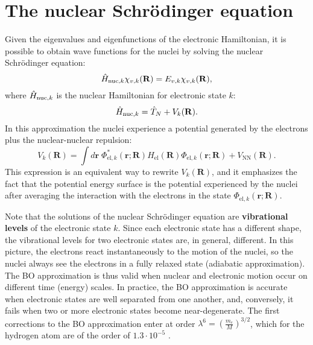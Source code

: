 \documentclass[../Main/chem532-notes.tex]{subfiles}
\begin{document}
\section{The nuclear Schr\"{o}dinger equation}
Given the eigenvalues and eigenfunctions of the electronic Hamiltonian, it is possible to obtain wave functions for the nuclei by solving the nuclear Schr\"{o}dinger equation:
\begin{equation}
\hat{H}_{{\rm nuc},k} \chi_{v,k}(\mathbf{R}) =  E_{v,k} \chi_{v,k}(\mathbf{R}),
\end{equation}
where $\hat{H}_{{\rm nuc},k}$ is the nuclear Hamiltonian for electronic state $k$:
\begin{equation}
\hat{H}_{{\rm nuc},k} = \hat{T}_{N} + V_{k}(\mathbf{R}).
\end{equation}
In this approximation the nuclei experience a potential generated by the electrons plus the nuclear-nuclear repulsion:
\begin{equation}
V_{k}(\mathbf{R}) = \int d\mathbf{r} \; \Phi^*_{\mathrm{el},k} (\mathbf{r};\mathbf{R}) \hat{H}_\mathrm{el}(\mathbf{R}) \Phi_{\mathrm{el},k} (\mathbf{r};\mathbf{R}) + V_\mathrm{NN}(\mathbf{R}).
\end{equation}
This expression is an equivalent way to rewrite $V_{k}(\mathbf{R}) $, and it emphasizes the fact that the potential energy surface is the potential experienced by the nuclei after averaging the interaction with the electrons in the state $\Phi_{\mathrm{el},k} (\mathbf{r};\mathbf{R})$.

Note that the solutions of the nuclear Schr\"{o}dinger equation are \textbf{vibrational levels} of the electronic state $k$.
Since each electronic state has a different shape, the vibrational levels for two electronic states are, in general, different.
In this picture, the electrons react instantaneously to the motion of the nuclei, so the nuclei always see the electrons in a fully relaxed state (adiabatic approximation).
The BO approximation is thus valid when nuclear and electronic motion occur on different time (energy) scales. In practice, the BO approximation is accurate when electronic states are well separated from one another, and, conversely, it fails when two or more electronic states become near-degenerate.
The first corrections to the BO approximation enter at order $\lambda^6 = \left( \frac{m_e}{M} \right)^{3/2}$, which for the hydrogen atom are of the order of $1.3 \cdot 10^{-5}$ \Eh.
\end{document}
